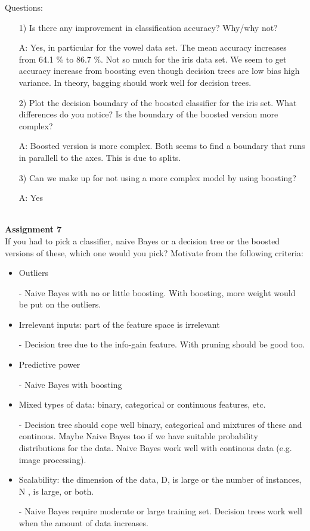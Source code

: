 \documentclass[a4paper,10pt]{article}
\begin{document}
\newpage
\noindent
Questions:
\begin{itemize}
  \item[1)] Is there any improvement in classification accuracy? Why/why not?
  \item[A:] Yes, in particular for the vowel data set. The mean accuracy increases from
    64.1 \% to 86.7 \%. Not so much for the iris data set. 
    We seem to get accuracy increase from boosting 
    even though decision trees are low bias high variance.
    In theory, bagging should work well for decision trees.
  \item[2)] Plot the decision boundary of the boosted classifier for the iris set.
    What differences do you notice? Is the boundary of the boosted version more
    complex?
  \item[A:] Boosted version is more complex. Both seems to find a boundary that runs
    in parallell to the axes. This is due to splits.
  \item[3)] Can we make up for not using a more complex model by using boosting?
  \item[A:] Yes
\end{itemize}






$ $\\
\textbf{Assignment 7}
\\
If you had to pick a classifier, naive Bayes or a decision tree or
the boosted versions of these, which one would you pick? Motivate from the following
criteria:
\begin{itemize}
  \item Outliers
  \item[-] Naive Bayes with no or little boosting. With boosting, more weight would be put
    on the outliers.
  \item Irrelevant inputs: part of the feature space is irrelevant
  \item[-] Decision tree due to the info-gain feature. With pruning should be good too.
  \item Predictive power
  \item[-] Naive Bayes with boosting
  \item Mixed types of data: binary, categorical or continuous features, etc.
  \item[-] Decision tree should cope well binary, categorical and mixtures of these and 
    continous. Maybe Naive Bayes too if we have suitable probability distributions for the 
    data. Naive Bayes work well with continous data (e.g. image processing).
  \item Scalability: the dimension of the data, D, is large or the number of instances,
    N , is large, or both.
  \item[-] Naive Bayes require moderate or large training set. Decision trees work well when 
    the amount of data increases.
\end{itemize}
\end{document}
